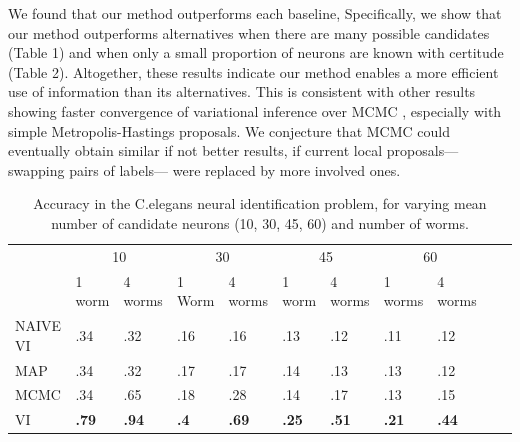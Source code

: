 \documentclass{article}
\begin{document}
We found that our method outperforms each
baseline, Specifically, we show that our method outperforms alternatives when there are many possible
candidates (Table 1) and when only a small proportion of neurons are known with
certitude (Table 2). 
Altogether, these results indicate our method enables a more efficient
use of information than its alternatives. This is consistent with
other results showing faster convergence of variational inference over
MCMC \citep{Blei2017}, especially with simple Metropolis-Hastings
proposals. We conjecture that MCMC could eventually obtain similar if
not better results, if current local proposals---swapping pairs of
labels--- were replaced by more involved ones.
\begin{table}[h!]
   \centering
  \begin{tabular}{lllllllllll}
    & \multicolumn{2}{c}{10} & \multicolumn{2}{c}{30} &   \multicolumn{2}{c}{45} & \multicolumn{2}{c}{60} \\
    \cmidrule(lr){2-3} \cmidrule(lr){4-5} \cmidrule(lr){6-7} \cmidrule(lr){8-9}
& 1 worm & 4 worms & 1 Worm & 4 worms & 1 worm & 4 worms & 1 worms & 4 worms \\
    \midrule 
    NAIVE VI &.34 & .32 & .16 & .16 & .13 & .12 & .11 & .12 \\
   MAP   & .34 & .32  &.17 &.17& .14 & .13 & .13 & .12 \\
    MCMC   & .34 & .65  &.18 &.28& .14 & .17 & .13 & .15 \\
    VI   & \textbf{.79} & \textbf{.94} & \textbf{.4} & \textbf{.69} & \textbf{.25}&  \textbf{.51} & \textbf{.21} & \textbf{.44}\\
 
    \bottomrule
  \end{tabular}
   \caption{Accuracy in the C.elegans neural identification problem, for varying mean number of candidate neurons (10, 30, 45, 60) and number of worms.}
   \label{table:celeganssup}
\end{table}
\end{document}
